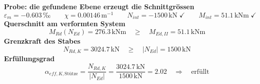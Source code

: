 \documentclass[11pt,a4paper]{article}
\begin{document}
\noindent\textbf{Probe: die gefundene Ebene erzeugt die Schnittgrössen}
\begin{equation*}
\varepsilon_m = -0.603\,\text{‰} \qquad \chi = 0.00146\,\mathrm{m}^{-1} \qquad N_{int} = -1500\,\mathrm{kN} \;\checkmark \qquad M_{int} = 51.1\,\mathrm{kNm} \;\checkmark
\end{equation*}
\noindent\textbf{Querschnitt am verformten System}
\begin{equation*}
M_{Rd}(N_{Ed}) = 276.3\,\mathrm{kNm} \quad \ge \quad M_{Ed,II} = 51.1\,\mathrm{kNm}
\end{equation*}
\noindent\textbf{Grenzkraft des Stabes}
\begin{equation*}
N_{Rd,K} = 3024.7\,\mathrm{kN} \quad \ge \quad \left|N_{Ed}\right| = 1500\,\mathrm{kN}
\end{equation*}
\noindent\textbf{Erfüllungsgrad}
\begin{equation*}
\alpha_{eff,K,\text{Stütze}} = \frac{N_{Rd,K}}{\left|N_{Ed}\right|} = \frac{3024.7\,\mathrm{kN}}{1500\,\mathrm{kN}} = 2.02 \quad \Rightarrow \quad \text{erfüllt}
\end{equation*}
\end{document}
